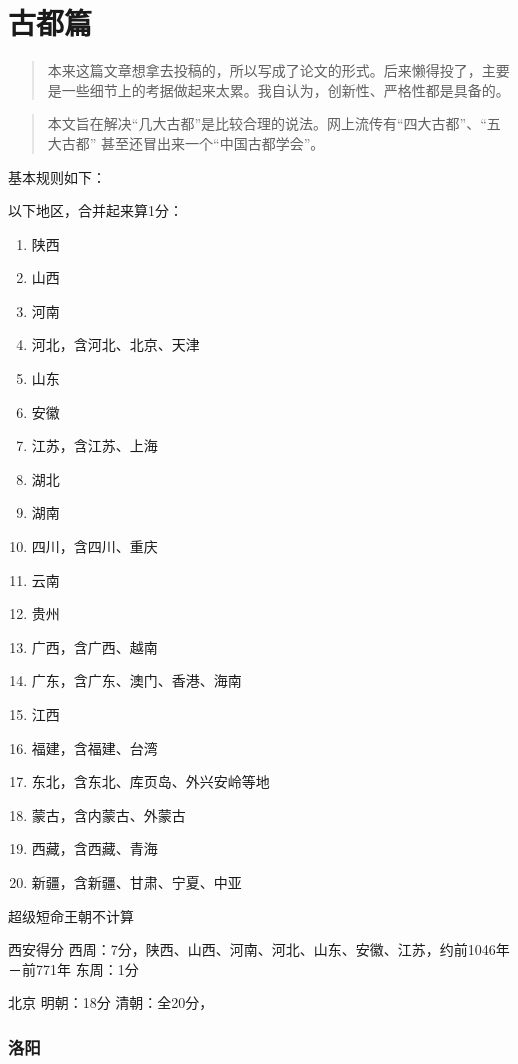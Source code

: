 \newpage
\chapter{古都篇}

\begin{quote}
本来这篇文章想拿去投稿的，所以写成了论文的形式。后来懒得投了，主要是一些细节上的考据做起来太累。我自认为，创新性、严格性都是具备的。
\end{quote}

\begin{abstract}
本文旨在解决“几大古都”是比较合理的说法。网上流传有“四大古都”、“五大古都”
甚至还冒出来一个“中国古都学会”。
\end{abstract}

基本规则如下：


以下地区，合并起来算1分：
\begin{enumerate}
\item 陕西
\item 山西
\item 河南
\item 河北，含河北、北京、天津
\item 山东
\item 安徽
\item 江苏，含江苏、上海
\item 湖北
\item 湖南
\item 四川，含四川、重庆
\item 云南
\item 贵州
\item 广西，含广西、越南
\item 广东，含广东、澳门、香港、海南
\item 江西
\item 福建，含福建、台湾
\item 东北，含东北、库页岛、外兴安岭等地
\item 蒙古，含内蒙古、外蒙古
\item 西藏，含西藏、青海
\item 新疆，含新疆、甘肃、宁夏、中亚
\end{enumerate}

超级短命王朝不计算

西安得分
西周：7分，陕西、山西、河南、河北、山东、安徽、江苏，约前1046年－前771年
东周：1分



北京
明朝：18分
清朝：全20分，


\subsection{洛阳}

